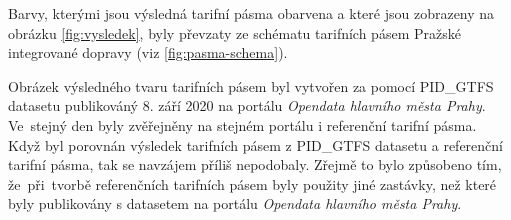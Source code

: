Barvy, kterými jsou výsledná tarifní pásma obarvena a které jsou zobrazeny na obrázku \ref{fig:vysledek}, byly převzaty
ze schématu tarifních pásem Pražské integrované dopravy (viz \ref{fig:pasma-schema}).  

Obrázek výsledného tvaru tarifních pásem byl vytvořen za pomocí PID\_GTFS datasetu publikováný 8. září 2020 na portálu \textit{Opendata
hlavního města Prahy}. Ve~stejný den byly zvěřejněny na stejném portálu i referenční tarifní pásma.
Když byl porovnán výsledek tarifních pásem z PID\_GTFS datasetu a referenční tarifní pásma, tak
se navzájem příliš nepodobaly. Zřejmě to bylo způsobeno tím, že~při~tvorbě referenčních tarifních pásem byly použity jiné zastávky,
než které byly publikovány s datasetem na portálu \textit{Opendata hlavního města Prahy}.
